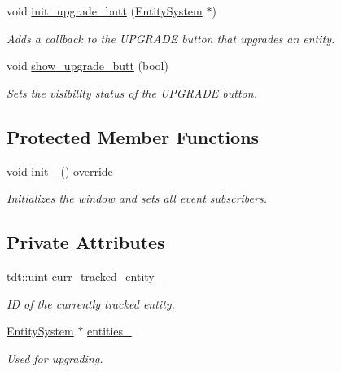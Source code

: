 \begin{DoxyCompactItemize}
void \hyperlink{class_entity_tracker_a562f4a8cfb73794b5e5e21e368057488}{init\+\_\+upgrade\+\_\+butt} (\hyperlink{class_entity_system}{Entity\+System} $\ast$)
\begin{DoxyCompactList}\small\item\em Adds a callback to the U\+P\+G\+R\+A\+DE button that upgrades an entity. \end{DoxyCompactList}\item 
void \hyperlink{class_entity_tracker_a70821e196f3fe0910bf72e6fa664a505}{show\+\_\+upgrade\+\_\+butt} (bool)
\begin{DoxyCompactList}\small\item\em Sets the visibility status of the U\+P\+G\+R\+A\+DE button. \end{DoxyCompactList}\end{DoxyCompactItemize}
\subsection*{Protected Member Functions}
\begin{DoxyCompactItemize}
\item 
void \hyperlink{class_entity_tracker_a4a1051b7efd0414225bd6b19b24bf5b1}{init\+\_\+} () override
\begin{DoxyCompactList}\small\item\em Initializes the window and sets all event subscribers. \end{DoxyCompactList}\end{DoxyCompactItemize}
\subsection*{Private Attributes}
\begin{DoxyCompactItemize}
\item 
tdt\+::uint \hyperlink{class_entity_tracker_a1ef585f0b346bffb880cbbaaa34f1f47}{curr\+\_\+tracked\+\_\+entity\+\_\+}
\begin{DoxyCompactList}\small\item\em ID of the currently tracked entity. \end{DoxyCompactList}\item 
\hyperlink{class_entity_system}{Entity\+System} $\ast$ \hyperlink{class_entity_tracker_ab7988f819653ef5a97df6f28170609d3}{entities\+\_\+}
\begin{DoxyCompactList}\small\item\em Used for upgrading. \end{DoxyCompactList}\end{DoxyCompactItemize}
